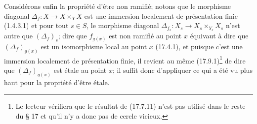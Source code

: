 Considérons enfin la propriété d'être non ramifié; notons que le morphisme diagonal $\Delta_f:X\to X\times_Y X$ est une immersion localement de présentation finie (1.4.3.1) et pour tout $s\in S$, le morphisme diagonal $\Delta_{f_s}:X_s\to X_s\times_{Y_s}X_s$ n'est autre que $(\Delta_f)_s$; dire que $f_{g(x)}$ est non ramifié au point $x$ équivaut à dire que $(\Delta_f)_{g(x)}$ est un isomorphisme local au point $x$ (17.4.1), et puisque c'est une immersion localement de présentation finie, il revient au même (17.9.1)\footnote{Le lecteur vérifiera que le résultat de (17.7.11) n'est pas utilisé dans le reste du § 17 et qu'il n'y a donc pas de cercle vicieux.} de dire que $(\Delta_f)_{g(x)}$ est étale au point $x$; il suffit donc d'appliquer ce qui a été vu plus haut pour la propriété d'être étale.

